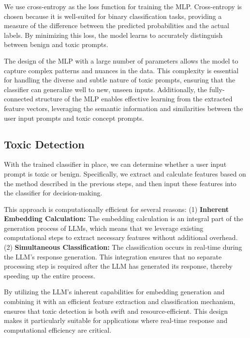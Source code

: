 We use cross-entropy as the loss function for training the MLP. Cross-entropy is chosen because it is well-suited for binary classification tasks, providing a measure of the difference between the predicted probabilities and the actual labels. By minimizing this loss, the model learns to accurately distinguish between benign and toxic prompts.

The design of the MLP with a large number of parameters allows the model to capture complex patterns and nuances in the data. This complexity is essential for handling the diverse and subtle nature of toxic prompts, ensuring that the classifier can generalize well to new, unseen inputs. Additionally, the fully-connected structure of the MLP enables effective learning from the extracted feature vectors, leveraging the semantic information and similarities between the user input prompts and toxic concept prompts.


\subsection{Toxic Detection}
\label{sec:toxic-detection}

With the trained classifier in place, we can determine whether a user input prompt is toxic or benign. Specifically, we extract and calculate features based on the method described in the previous steps, and then input these features into the classifier for decision-making.

This approach is computationally efficient for several reasons: (1) \textbf{Inherent Embedding Calculation:} The embedding calculation is an integral part of the generation process of LLMs, which means that we leverage existing computational steps to extract necessary features without additional overhead. (2) \textbf{Simultaneous Classification:} The classification occurs in real-time during the LLM's response generation. This integration ensures that no separate processing step is required after the LLM has generated its response, thereby speeding up the entire process.

By utilizing the LLM's inherent capabilities for embedding generation and combining it with an efficient feature extraction and classification mechanism, \tool{} ensures that toxic detection is both swift and resource-efficient. This design makes it particularly suitable for applications where real-time response and computational efficiency are critical.
